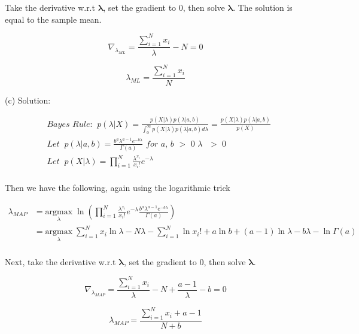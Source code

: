 \documentclass{article}
\begin{document}
\begin{flushleft}
Take the derivative w.r.t $\boldsymbol{\lambda}$, set the gradient to 0, then solve $\boldsymbol{\lambda}$. The solution is equal to the sample mean. 
\end{flushleft}

\begin{equation*}
\nabla_{\lambda_{ML}} = {\frac{\sum_{i=1}^N{x_i}}{\lambda}} - N = 0
\end{equation*}

\begin{equation*}
\lambda_{ML} = {\frac{\sum_{i=1}^N{x_i}}{N}}
\end{equation*}

\begin{flushleft}
(c) Solution: 
\end{flushleft}

\begin{align*} 
& \textit{Bayes Rule:} \;\;  p(\lambda|X) = \frac{p(X|\lambda) p(\lambda|a,b)}{\int_{0}^{\infty} p(X|\lambda) p(\lambda|a,b) d\lambda} = \frac{p(X|\lambda) p(\lambda|a,b)}{p(X)} \\
&\textit{Let} \;\; p(\lambda|a, b)  = \frac{b^a\lambda^{a-1}e^{-b\lambda}}{\Gamma(a)} \textit{ for a, b $>$ 0 $\lambda$ $>$ 0} \\
&\textit{Let} \;\; p(X|\lambda) = \prod_{i=1}^N\frac{\lambda^{x_i}}{x_i!} e^{-\lambda} \\
\end{align*}

\begin{flushleft}
Then we have the following, again using the logarithmic trick
\end{flushleft}

\begin{equation*}
\begin{split}
\lambda_{MAP} & = \underset{\lambda}{\mathrm{argmax}} \; \ln{(\prod_{i=1}^N\frac{\lambda^{x_i}}{x_i!} e^{-\lambda} \frac{b^a\lambda^{a-1}e^{-b\lambda}}{\Gamma(a)})} \\
& = \underset{\lambda}{\mathrm{argmax}} \; {\sum_{i=1}^N{x_i}\ln{\lambda} }  - {N\lambda}  -  {\sum_{i=1}^N\ln{x_i!}} + a\ln{b} + (a-1)\ln{\lambda} - b\lambda - \ln{\Gamma(a)}\\
\end{split}
\end{equation*}

\begin{flushleft}
Next, take the derivative w.r.t $\boldsymbol{\lambda}$, set the gradient to 0, then solve $\boldsymbol{\lambda}$.
\end{flushleft}

\begin{equation*}
\nabla_{\lambda_{MAP}} = {\frac{\sum_{i=1}^N{x_i}}{\lambda}} - N + \frac{a-1}{\lambda} - b = 0
\end{equation*}

\begin{equation*}
\lambda_{MAP} = \frac{{\sum_{i=1}^N{x_i}} + a - 1}{N + b}
\end{equation*}
\end{document}
